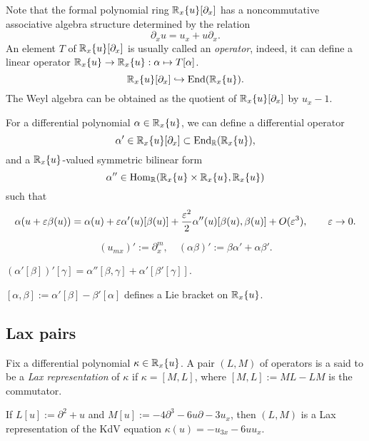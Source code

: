 \documentclass{../../../small}
\begin{document}
\begin{prb}
Note that the formal polynomial ring $\mathbb{R}_x\{u\}[\partial_x]$ has a noncommutative associative algebra structure determined by the relation
\[\partial_xu=u_x+u\partial_x.\]
An element $T$ of $\mathbb{R}_x\{u\}[\partial_x]$ is usually called an \emph{operator}, indeed, it can define a linear operator $\mathbb{R}_x\{u\}\to\mathbb{R}_x\{u\}:\alpha\mapsto T[\alpha]$.
\[\mathbb{R}_x\{u\}[\partial_x]\hookrightarrow\operatorname{End}(\mathbb{R}_x\{u\}).\]
The Weyl algebra can be obtained as the quotient of $\mathbb{R}_x\{u\}[\partial_x]$ by $u_x-1$.
\end{prb}

\begin{prb}
For a differential polynomial $\alpha\in\mathbb{R}_x\{u\}$, we can define a differential operator
\[\alpha'\in\mathbb{R}_x\{u\}[\partial_x]\subset\operatorname{End}_{\mathbb{R}}(\mathbb{R}_x\{u\}),\] and a $\mathbb{R}_x\{u\}$-valued symmetric bilinear form
\[\alpha''\in\operatorname{Hom}_{\mathbb{R}}(\mathbb{R}_x\{u\}\times\mathbb{R}_x\{u\},\mathbb{R}_x\{u\})\]
such that
\[\alpha(u+\varepsilon\beta(u))=\alpha(u)+\varepsilon\alpha'(u)[\beta(u)]+\frac{\varepsilon^2}2\alpha''(u)[\beta(u),\beta(u)]+O(\varepsilon^3),\qquad\varepsilon\to0.\]

\[(u_{mx})':=\partial_x^m,\quad(\alpha\beta)':=\beta\alpha'+\alpha\beta'.\]
\begin{parts}
\item $(\alpha'[\beta])'[\gamma]=\alpha''[\beta,\gamma]+\alpha'[\beta'[\gamma]]$.
\item $[\alpha,\beta]:=\alpha'[\beta]-\beta'[\alpha]$ defines a Lie bracket on $\mathbb{R}_x\{u\}$.
\end{parts}
\end{prb}


\subsection*{Lax pairs}

\begin{prb}
Fix a differential polynomial $\kappa\in\mathbb{R}_x\{u\}$.
A pair $(L,M)$ of operators is a said to be a \emph{Lax representation} of $\kappa$ if $\kappa=[M,L]$, where $[M,L]:=ML-LM$ is the commutator.
\begin{parts}
\item If $L[u]:=\partial^2+u$ and $M[u]:=-4\partial^3-6u\partial-3u_x$, then $(L,M)$ is a Lax representation of the KdV equation $\kappa(u)=-u_{3x}-6uu_x$.
\end{parts}
\end{prb}


\begin{prb}

\end{prb}
\end{document}
